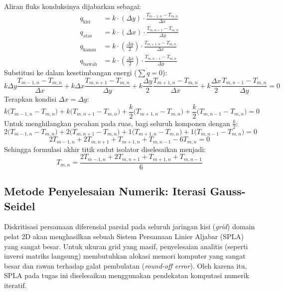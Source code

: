 \documentclass[12pt,a4paper]{article}
\begin{document}
Aliran fluks konduksinya dijabarkan sebagai:
\begin{align*}
    q_{\text{kiri}}  &= k \cdot (\Delta y) \cdot \frac{T_{m-1,n} - T_{m,n}}{\Delta x} \\
    q_{\text{atas}}  &= k \cdot (\Delta x) \cdot \frac{T_{m,n+1} - T_{m,n}}{\Delta y} \\
    q_{\text{kanan}} &= k \cdot \left(\frac{\Delta y}{2}\right) \cdot \frac{T_{m+1,n} - T_{m,n}}{\Delta x} \\
    q_{\text{bawah}} &= k \cdot \left(\frac{\Delta x}{2}\right) \cdot \frac{T_{m,n-1} - T_{m,n}}{\Delta y}
\end{align*}
Substitusi ke dalam kesetimbangan energi ($\sum q = 0$):
\begin{equation}
    k \Delta y \frac{T_{m-1,n} - T_{m,n}}{\Delta x} + k \Delta x \frac{T_{m,n+1} - T_{m,n}}{\Delta y} + k \frac{\Delta y}{2} \frac{T_{m+1,n} - T_{m,n}}{\Delta x} + k \frac{\Delta x}{2} \frac{T_{m,n-1} - T_{m,n}}{\Delta y} = 0
\end{equation}
Terapkan kondisi $\Delta x = \Delta y$:
\begin{equation}
    k \big(T_{m-1,n} - T_{m,n}\big) + k \big(T_{m,n+1} - T_{m,n}\big) + \frac{k}{2} \big(T_{m+1,n} - T_{m,n}\big) + \frac{k}{2} \big(T_{m,n-1} - T_{m,n}\big) = 0
\end{equation}
Untuk menghilangkan pecahan pada ruas, bagi seluruh komponen dengan $\frac{k}{2}$:
\begin{equation}
    2 \big(T_{m-1,n} - T_{m,n}\big) + 2 \big(T_{m,n+1} - T_{m,n}\big) + 1 \big(T_{m+1,n} - T_{m,n}\big) + 1 \big(T_{m,n-1} - T_{m,n}\big) = 0
\end{equation}
\begin{equation}
    2T_{m-1,n} + 2T_{m,n+1} + T_{m+1,n} + T_{m,n-1} - 6T_{m,n} = 0
\end{equation}
Sehingga formulasi akhir titik sudut isolator diselesaikan menjadi:
\begin{equation} \label{eq:insulator_corner_final}
    T_{m,n} = \frac{2T_{m-1,n} + 2T_{m,n+1} + T_{m+1,n} + T_{m,n-1}}{6}
\end{equation}

\subsection{Metode Penyelesaian Numerik: Iterasi Gauss-Seidel}
Diskritisasi persamaan diferensial parsial pada seluruh jaringan kisi (\textit{grid}) domain pelat 2D akan menghasilkan sebuah Sistem Persamaan Linier Aljabar (SPLA) yang sangat besar. Untuk ukuran grid yang masif, penyelesaian analitis (seperti inversi matriks langsung) membutuhkan alokasi memori komputer yang sangat besar dan rawan terhadap galat pembulatan (\textit{round-off error}). Oleh karena itu, SPLA pada tugas ini diselesaikan menggunakan pendekatan komputasi numerik iteratif.
\end{document}
